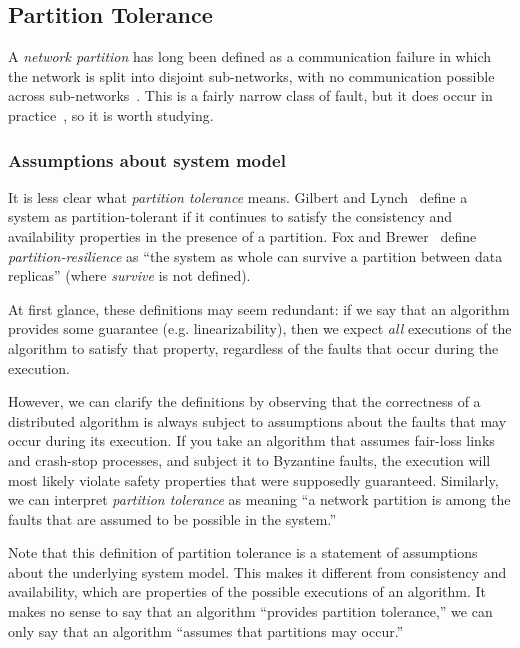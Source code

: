 \documentclass[a4paper,twocolumn,10pt]{article}
\begin{document}
\subsection{Partition Tolerance}\label{sec:partitions}

A \emph{network partition} has long been defined as a communication failure in which the network is
split into disjoint sub-networks, with no communication possible across
sub-networks~\cite{Johnson1975we}. This is a fairly narrow class of fault, but it does occur in
practice~\cite{Bailis2014jx}, so it is worth studying.

\subsubsection{Assumptions about system model}

It is less clear what \emph{partition tolerance} means. Gilbert and Lynch~\cite{Gilbert2002il}
define a system as partition-tolerant if it continues to satisfy the consistency and availability
properties in the presence of a partition. Fox and Brewer~\cite{Fox1999bs} define
\emph{partition-resilience} as ``the system as whole can survive a partition between data replicas''
(where \emph{survive} is not defined).

At first glance, these definitions may seem redundant: if we say that an algorithm provides some
guarantee (e.g. linearizability), then we expect \emph{all} executions of the algorithm to satisfy
that property, regardless of the faults that occur during the execution.

However, we can clarify the definitions by observing that the correctness of a distributed algorithm
is always subject to assumptions about the faults that may occur during its execution. If you take
an algorithm that assumes fair-loss links and crash-stop processes, and subject it to Byzantine
faults, the execution will most likely violate safety properties that were supposedly guaranteed.
Similarly, we can interpret \emph{partition tolerance} as meaning ``a network partition is among the
faults that are assumed to be possible in the system.''

Note that this definition of partition tolerance is a statement of assumptions about the underlying
system model. This makes it different from consistency and availability, which are properties of the
possible executions of an algorithm. It makes no sense to say that an algorithm ``provides partition
tolerance,'' we can only say that an algorithm ``assumes that partitions may occur.''
\end{document}
